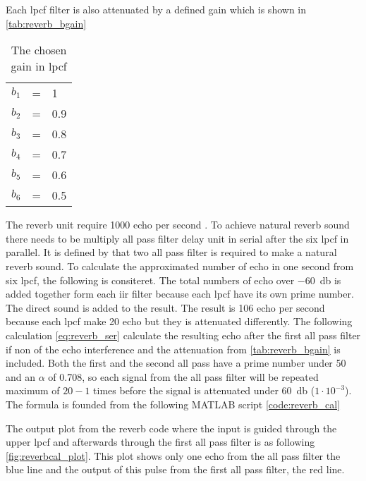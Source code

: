 Each \gls{lpcf} filter is also attenuated by a defined gain which is shown in \autoref{tab:reverb_bgain}

\begin{table}[htbp]
\centering
\caption{The chosen gain in \gls{lpcf}}
\label{tab:reverb_bgain}
\begin{tabular}{lll}
$b_1$ & = & 1 \\
$b_2$ & = & 0.9 \\
$b_3$ & = & 0.8 \\
$b_4$ & = & 0.7 \\
$b_5$ & = & 0.6 \\
$b_6$ & = & 0.5 
\end{tabular}
\end{table}


The \gls{reverb} unit require 1000 echo per second \citep{natural_sounding_revorb}. To achieve natural \gls{reverb} sound there needs to be multiply all pass filter delay unit in serial after the six \gls{lpcf} in parallel. It is defined by \citep{natural_sounding_revorb} that two all pass filter is required to make a natural \gls{reverb} sound.
To calculate the approximated number of echo in one second from six \gls{lpcf}, the following is consiteret. The total numbers of echo over \SI{-60}{\decibel} is added together form each \gls{iir} filter because each \gls{lpcf} have its own prime number. The direct sound is added to the result. The result is 106 echo per second because each \gls{lpcf} make 20 echo but they is attenuated differently. The following calculation \autoref{eq:reverb_ser} calculate the resulting echo after the first all pass filter if non of the echo interference and the attenuation from \autoref{tab:reverb_bgain} is included. Both the first and the second all pass have a prime number under 50 and an $\alpha$ of 0.708, so each signal from the all pass filter will be repeated maximum of $20-1$ times before the signal is attenuated under \SI{60}{\decibel} ($1 \cdot 10^{-3}$). The formula is founded from the following MATLAB script \autoref{code:reverb_cal}


The output plot from the \gls{reverb} code where the input is guided through the upper \gls{lpcf} and afterwards through the first all pass filter is as following \autoref{fig:reverbcal_plot}. This plot shows only one echo from the all pass filter the blue line and the output of this pulse from the first all pass filter, the red line.

